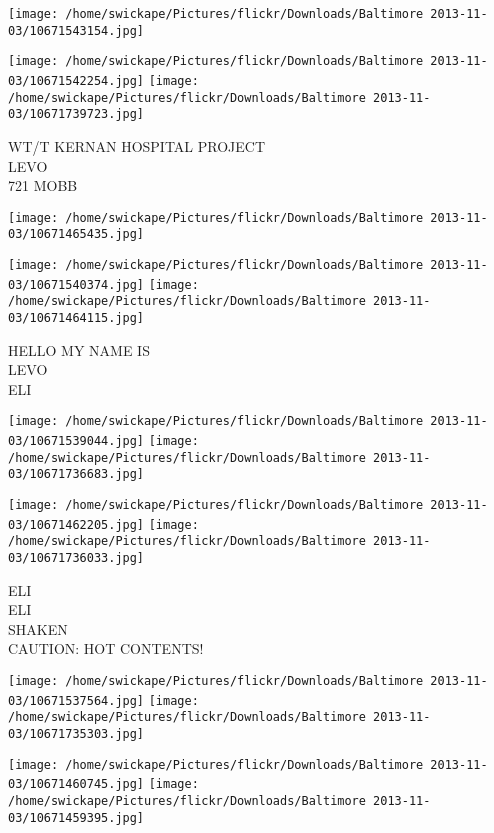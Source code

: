 \documentclass[10pt,letterpaper]{article}
\begin{document}
\texttt{[image: /home/swickape/Pictures/flickr/Downloads/Baltimore 2013-11-03/10671543154.jpg]}

\vspace{0.25in}
\texttt{[image: /home/swickape/Pictures/flickr/Downloads/Baltimore 2013-11-03/10671542254.jpg]}
\texttt{[image: /home/swickape/Pictures/flickr/Downloads/Baltimore 2013-11-03/10671739723.jpg]}

WT/T KERNAN HOSPITAL PROJECT\\
LEVO\\
721 MOBB\\
\pagebreak

\texttt{[image: /home/swickape/Pictures/flickr/Downloads/Baltimore 2013-11-03/10671465435.jpg]}

\vspace{0.25in}
\texttt{[image: /home/swickape/Pictures/flickr/Downloads/Baltimore 2013-11-03/10671540374.jpg]}
\texttt{[image: /home/swickape/Pictures/flickr/Downloads/Baltimore 2013-11-03/10671464115.jpg]}

HELLO MY NAME IS\\
LEVO\\
ELI\\
\pagebreak

\texttt{[image: /home/swickape/Pictures/flickr/Downloads/Baltimore 2013-11-03/10671539044.jpg]}
\texttt{[image: /home/swickape/Pictures/flickr/Downloads/Baltimore 2013-11-03/10671736683.jpg]}

\texttt{[image: /home/swickape/Pictures/flickr/Downloads/Baltimore 2013-11-03/10671462205.jpg]}
\texttt{[image: /home/swickape/Pictures/flickr/Downloads/Baltimore 2013-11-03/10671736033.jpg]}

ELI\\
ELI\\
SHAKEN\\
CAUTION: HOT CONTENTS!\\
\pagebreak

\texttt{[image: /home/swickape/Pictures/flickr/Downloads/Baltimore 2013-11-03/10671537564.jpg]}
\texttt{[image: /home/swickape/Pictures/flickr/Downloads/Baltimore 2013-11-03/10671735303.jpg]}

\texttt{[image: /home/swickape/Pictures/flickr/Downloads/Baltimore 2013-11-03/10671460745.jpg]}
\texttt{[image: /home/swickape/Pictures/flickr/Downloads/Baltimore 2013-11-03/10671459395.jpg]}
\end{document}
